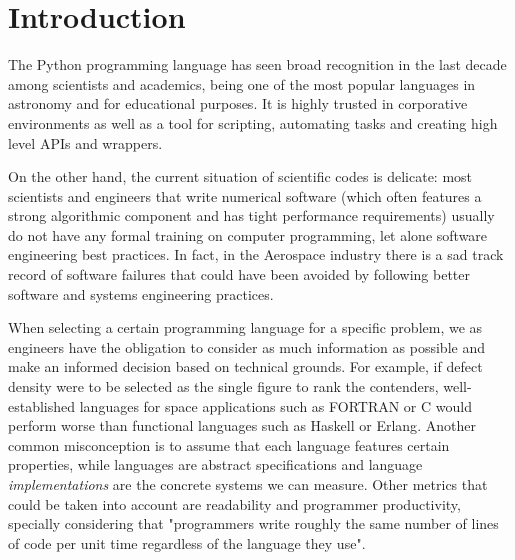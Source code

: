 \section{Introduction}
\label{sec:intro}

The Python programming language has seen broad recognition in the last decade among scientists and academics, being one of the most popular languages in astronomy\citep{Robitaille2013} and for educational purposes\citep{guo2014python}. It is highly trusted in corporative environments as well as a tool for scripting, automating tasks and creating high level APIs and wrappers.

On the other hand, the current situation of scientific codes is delicate: most scientists and engineers that write numerical software (which often features a strong algorithmic component and has tight performance requirements) usually do not have any formal training on computer programming, let alone software engineering best practices\citep{Wilson2014}. In fact, in the Aerospace industry there is a sad track record of software failures\citep{albee2000report,lions1996report} that could have been avoided by following better software and systems engineering practices.

When selecting a certain programming language for a specific problem, we as engineers have the obligation to consider as much information as possible and make an informed decision based on technical grounds. For example, if defect density were to be selected as the single figure to rank the contenders, well-established languages for space applications such as FORTRAN or C would perform worse than functional languages such as Haskell or Erlang\citep{Ray2014}. Another common misconception is to assume that each language features certain properties, while languages are abstract specifications and language \textit{implementations} are the concrete systems we can measure. Other metrics that could be taken into account are readability and programmer productivity, specially considering that "programmers write roughly the same number of lines of code per unit time regardless of the language they use"\citep{Wilson2014}.


